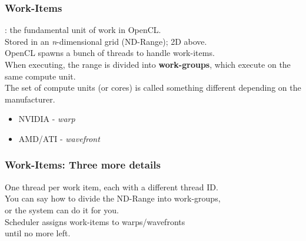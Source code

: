 \begin{frame}
  \frametitle{Work-Items}


    : the fundamental unit of work in OpenCL.\\
    Stored in an {\it n}-dimensional grid (ND-Range); 2D above.\\[1em]

    OpenCL spawns a bunch of threads to handle work-items.\\
    When executing, the range is divided into {\bf work-groups}, which
      execute on the same compute unit.\\[1em]

    The set of compute units (or cores) is called something different
          depending on the manufacturer.
          \begin{itemize}
            \item NVIDIA - {\it warp}
            \item AMD/ATI - {\it wavefront}
          \end{itemize}

\end{frame}

\begin{frame}
  \frametitle{Work-Items: Three more details}


  One thread per work item, each with a different thread ID.\\[1em]

  You can say how to divide the ND-Range into work-groups, \\
  or the system can do it for you.\\[1em]

  Scheduler assigns work-items to warps/wavefronts\\ until no more left.


\end{frame}

